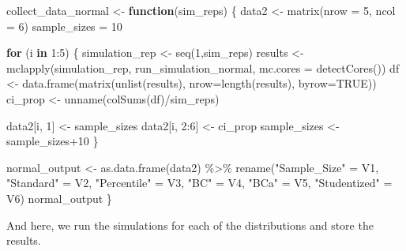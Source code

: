 \documentclass[12pt]{article}
\newenvironment{Shaded}{\begin{snugshade}}{\end{snugshade}}
\newcommand{\AttributeTok}[1]{\textcolor[rgb]{0.77,0.63,0.00}{#1}}
\newcommand{\ConstantTok}[1]{\textcolor[rgb]{0.00,0.00,0.00}{#1}}
\newcommand{\ControlFlowTok}[1]{\textcolor[rgb]{0.13,0.29,0.53}{\textbf{#1}}}
\newcommand{\DecValTok}[1]{\textcolor[rgb]{0.00,0.00,0.81}{#1}}
\newcommand{\FunctionTok}[1]{\textcolor[rgb]{0.00,0.00,0.00}{#1}}
\newcommand{\NormalTok}[1]{#1}
\newcommand{\OtherTok}[1]{\textcolor[rgb]{0.56,0.35,0.01}{#1}}
\newcommand{\SpecialCharTok}[1]{\textcolor[rgb]{0.00,0.00,0.00}{#1}}
\newcommand{\StringTok}[1]{\textcolor[rgb]{0.31,0.60,0.02}{#1}}
\begin{document}
\begin{Shaded}
\begin{Highlighting}[]
\NormalTok{collect\_data\_normal }\OtherTok{\textless{}{-}} \ControlFlowTok{function}\NormalTok{(sim\_reps) \{}
\NormalTok{  data2 }\OtherTok{\textless{}{-}} \FunctionTok{matrix}\NormalTok{(}\AttributeTok{nrow =} \DecValTok{5}\NormalTok{, }\AttributeTok{ncol =} \DecValTok{6}\NormalTok{)}
\NormalTok{  sample\_sizes }\OtherTok{=} \DecValTok{10}
  
  \ControlFlowTok{for}\NormalTok{ (i }\ControlFlowTok{in} \DecValTok{1}\SpecialCharTok{:}\DecValTok{5}\NormalTok{) \{}
\NormalTok{    simulation\_rep }\OtherTok{\textless{}{-}} \FunctionTok{seq}\NormalTok{(}\DecValTok{1}\NormalTok{,sim\_reps)}
\NormalTok{    results }\OtherTok{\textless{}{-}} \FunctionTok{mclapply}\NormalTok{(simulation\_rep, run\_simulation\_normal, }
                        \AttributeTok{mc.cores =} \FunctionTok{detectCores}\NormalTok{())}
\NormalTok{    df }\OtherTok{\textless{}{-}} \FunctionTok{data.frame}\NormalTok{(}\FunctionTok{matrix}\NormalTok{(}\FunctionTok{unlist}\NormalTok{(results), }\AttributeTok{nrow=}\FunctionTok{length}\NormalTok{(results), }\AttributeTok{byrow=}\ConstantTok{TRUE}\NormalTok{))}
\NormalTok{    ci\_prop }\OtherTok{\textless{}{-}} \FunctionTok{unname}\NormalTok{(}\FunctionTok{colSums}\NormalTok{(df)}\SpecialCharTok{/}\NormalTok{sim\_reps)}
    
\NormalTok{    data2[i, }\DecValTok{1}\NormalTok{] }\OtherTok{\textless{}{-}}\NormalTok{ sample\_sizes}
\NormalTok{    data2[i, }\DecValTok{2}\SpecialCharTok{:}\DecValTok{6}\NormalTok{] }\OtherTok{\textless{}{-}}\NormalTok{ ci\_prop}
\NormalTok{    sample\_sizes }\OtherTok{\textless{}{-}}\NormalTok{ sample\_sizes}\SpecialCharTok{+}\DecValTok{10}
\NormalTok{  \}}
  
\NormalTok{  normal\_output }\OtherTok{\textless{}{-}} \FunctionTok{as.data.frame}\NormalTok{(data2) }\SpecialCharTok{\%\textgreater{}\%} 
    \FunctionTok{rename}\NormalTok{(}\StringTok{"Sample\_Size"} \OtherTok{=}\NormalTok{ V1, }\StringTok{"Standard"} \OtherTok{=}\NormalTok{ V2, }\StringTok{"Percentile"} \OtherTok{=}\NormalTok{ V3, }\StringTok{"BC"} \OtherTok{=}\NormalTok{ V4, }
           \StringTok{"BCa"} \OtherTok{=}\NormalTok{ V5, }\StringTok{"Studentized"} \OtherTok{=}\NormalTok{ V6) }
\NormalTok{  normal\_output}
\NormalTok{\}}
\end{Highlighting}
\end{Shaded}

And here, we run the simulations for each of the distributions and store
the results.
\end{document}
